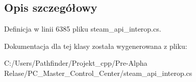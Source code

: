 \subsection{Opis szczegółowy}


Definicja w linii 6385 pliku steam\+\_\+api\+\_\+interop.\+cs.



Dokumentacja dla tej klasy została wygenerowana z pliku\+:\begin{DoxyCompactItemize}
\item 
C\+:/\+Users/\+Pathfinder/\+Projekt\+\_\+cpp/\+Pre-\/\+Alpha Relase/\+P\+C\+\_\+\+Master\+\_\+\+Control\+\_\+\+Center/steam\+\_\+api\+\_\+interop.\+cs\end{DoxyCompactItemize}

